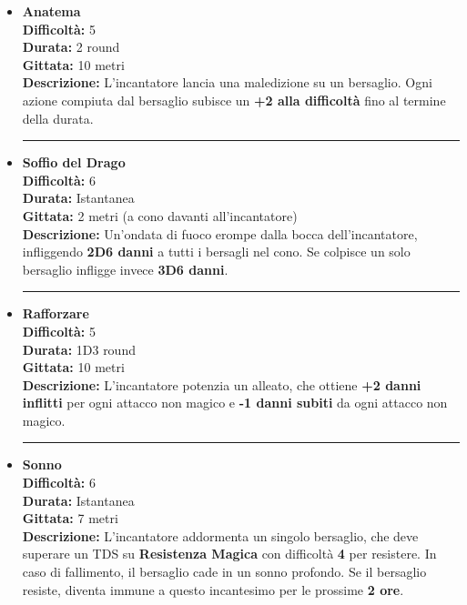\documentclass[./magie.tex]{subfiles}
\begin{document}
\begin{itemize}

\item \textbf{Anatema} \\
\textbf{Difficoltà:} 5 \\
\textbf{Durata:} 2 round \\
\textbf{Gittata:} 10 metri \\
\textbf{Descrizione:} L'incantatore lancia una maledizione su un bersaglio. Ogni azione compiuta dal bersaglio subisce un \textbf{+2 alla difficoltà} fino al termine della durata.

\vspace{0.2cm}
\noindent
\begin{center}
\rule{\textwidth}{0.4pt} 
\end{center}
\vspace{0.2cm}

\item \textbf{Soffio del Drago} \\
\textbf{Difficoltà:} 6 \\
\textbf{Durata:} Istantanea \\
\textbf{Gittata:} 2 metri (a cono davanti all'incantatore) \\
\textbf{Descrizione:} Un'ondata di fuoco erompe dalla bocca dell'incantatore, infliggendo \textbf{2D6 danni} a tutti i bersagli nel cono. Se colpisce un solo bersaglio infligge invece \textbf{3D6 danni}.

\vspace{0.2cm}
\noindent
\begin{center}
\rule{\textwidth}{0.4pt} 
\end{center}
\vspace{0.2cm}

\item \textbf{Rafforzare} \\
\textbf{Difficoltà:} 5 \\
\textbf{Durata:} 1D3 round \\
\textbf{Gittata:} 10 metri \\
\textbf{Descrizione:} L'incantatore potenzia un alleato, che ottiene \textbf{+2 danni inflitti} per ogni attacco non magico e \textbf{-1 danni subiti} da ogni attacco non magico.

\vspace{0.2cm}
\noindent
\begin{center}
\rule{\textwidth}{0.4pt} 
\end{center}
\vspace{0.2cm}
\clearpage
\item \textbf{Sonno} \\
\textbf{Difficoltà:} 6 \\
\textbf{Durata:} Istantanea \\
\textbf{Gittata:} 7 metri \\
\textbf{Descrizione:} L'incantatore addormenta un singolo bersaglio, che deve superare un TDS su \textbf{Resistenza Magica} con difficoltà \textbf{4} per resistere. In caso di fallimento, il bersaglio cade in un sonno profondo. Se il bersaglio resiste, diventa immune a questo incantesimo per le prossime \textbf{2 ore}.


\end{itemize}
\end{document}
